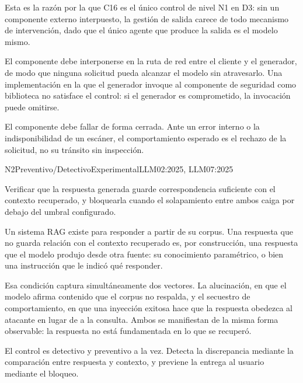 Esta es la razón por la que C16 es el único control de nivel N1 en D3: sin un componente externo interpuesto, la gestión de salida carece de todo mecanismo de intervención, dado que el único agente que produce la salida es el modelo mismo.

El componente debe interponerse en la ruta de red entre el cliente y el generador, de modo que ninguna solicitud pueda alcanzar el modelo sin atravesarlo. Una implementación en la que el generador invoque al componente de seguridad como biblioteca no satisface el control: si el generador es comprometido, la invocación puede omitirse.

El componente debe fallar de forma cerrada. Ante un error interno o la indisponibilidad de un escáner, el comportamiento esperado es el rechazo de la solicitud, no su tránsito sin inspección.


  {N2}{Preventivo/Detectivo}{Experimental}{LLM02:2025, LLM07:2025}

Verificar que la respuesta generada guarde correspondencia suficiente con el contexto recuperado, y bloquearla cuando el solapamiento entre ambos caiga por debajo del umbral configurado.

Un sistema RAG existe para responder a partir de su corpus. Una respuesta que no guarda relación con el contexto recuperado es, por construcción, una respuesta que el modelo produjo desde otra fuente: su conocimiento paramétrico, o bien una instrucción que le indicó qué responder.

Esa condición captura simultáneamente dos vectores. La alucinación, en que el modelo afirma contenido que el corpus no respalda, y el secuestro de comportamiento, en que una inyección exitosa hace que la respuesta obedezca al atacante en lugar de a la consulta. Ambos se manifiestan de la misma forma observable: la respuesta no está fundamentada en lo que se recuperó.

El control es detectivo y preventivo a la vez. Detecta la discrepancia mediante la comparación entre respuesta y contexto, y previene la entrega al usuario mediante el bloqueo.

